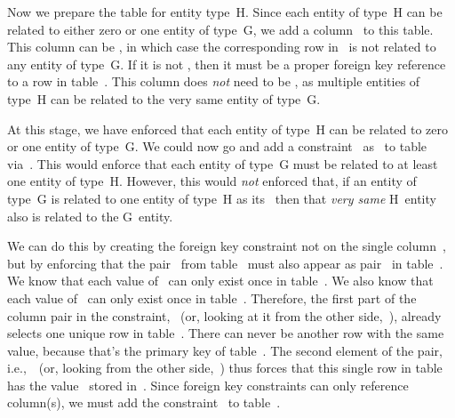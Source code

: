 Now we prepare the table for entity type~H.
Since each entity of type~H can be related to either zero or one entity of type~G, we add a column~ to this table.
This column can be , in which case the corresponding row in~ is not related to any entity of type~G.
If it is not , then it must be a proper foreign key reference to a row in table~.
This column does \emph{not} need to be , as multiple entities of type~H can be related to the very same entity of type~G.%
%
\begin{sloppypar}%
At this stage, we have enforced that each entity of type~H can be related to zero or one entity of type~G.
We could now go and add a constraint~ as~ to table~ via~.
This would enforce that each entity of type~G must be related to at least one entity of type~H.
However, this would \emph{not} enforced that, if an entity of type~G is related to one entity of type~H as its~ then that \emph{very same} H~entity also is related to the G~entity.%
\end{sloppypar}%
%
We can do this by creating the foreign key  constraint not on the single column~, but by enforcing that the pair~ from table~ must also appear as pair~ in table~.
We know that each value of~ can only exist once in table~.
We also know that each value of~ can only exist once in table~.
Therefore, the first part of the column pair in the constraint, ~(or, looking at it from the other side,~), already selects one unique row in table~.
There can never be another row with the same~ value, because that's the primary key of table~.
The second element of the pair, i.e.,~~(or, looking from the other side,~) thus forces that this single row in table~ has the value~ stored in~.
Since foreign key  constraints can only reference  column(s), we must add the constraint~ to table~.%
%
